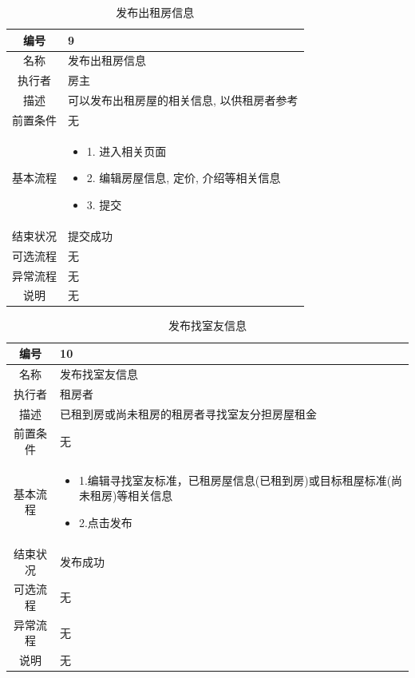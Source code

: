 \begin{table}[htbp]
	\centering
	\begin{tabular}{|c|p{11cm}|}
        \hline
        编号 & 9 \\
        \hline
        名称 & 发布出租房信息 \\ 
        \hline
        执行者 & 房主 \\
        \hline
        描述 & 可以发布出租房屋的相关信息, 以供租房者参考\\
        \hline
        前置条件 & 无 \\
        \hline
        基本流程 & \begin{itemize}
            \item 1. 进入相关页面
            \item 2. 编辑房屋信息, 定价, 介绍等相关信息
            \item 3. 提交
        \end{itemize} \\
        \hline
        结束状况 & 提交成功 \\
        \hline
        可选流程 & 无 \\
        \hline
        异常流程 & 无 \\
        \hline
        说明 & 无 \\
        \hline
    \end{tabular}
    \caption{发布出租房信息}
\end{table}

\begin{table}[htbp]
	\centering
	\begin{tabular}{|c|p{11cm}|}
        \hline
        编号 & 10 \\
        \hline
        名称 & 发布找室友信息 \\ 
        \hline
        执行者 & 租房者 \\
        \hline
        描述 & 已租到房或尚未租房的租房者寻找室友分担房屋租金 \\
        \hline
        前置条件 & 无 \\
        \hline
        基本流程 & \begin{itemize}
            \item 1.编辑寻找室友标准，已租房屋信息(已租到房)或目标租屋标准(尚未租房)等相关信息
            \item 2.点击发布
        \end{itemize} \\
        \hline
        结束状况 & 发布成功 \\
        \hline
        可选流程 & 无 \\
        \hline
        异常流程 & 无 \\
        \hline
        说明 & 无 \\
        \hline
    \end{tabular}
    \caption{发布找室友信息}
\end{table}

